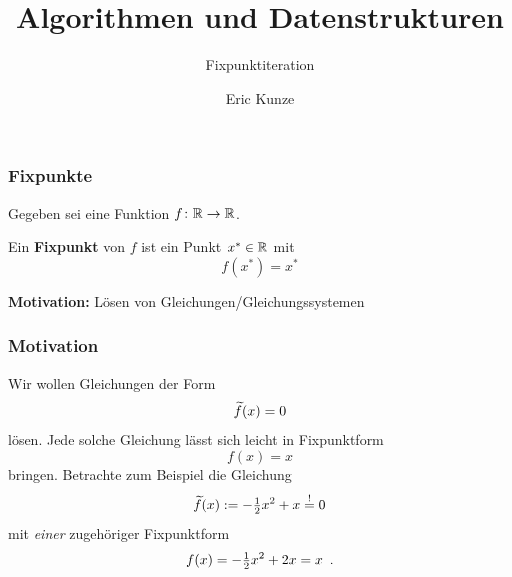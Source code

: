\documentclass{beamer}
\begin{document}
	
	\title{Algorithmen und Datenstrukturen}
	\subtitle{Fixpunktiteration}
	\author{Eric Kunze}
	\date{}

	\maketitle



\begin{frame} \frametitle{Fixpunkte}
	Gegeben sei eine Funktion $f \colon \mathbb{R} \to \mathbb{R}$. 
	
	\begin{definition}
		Ein \textbf{Fixpunkt} von $f$ ist ein Punkt $x^\ast \in \mathbb{R}$ mit
		\begin{equation}
			f(x^\ast) = x^\ast
		\end{equation}
	\end{definition}

	\textbf{Motivation:} Lösen von Gleichungen/Gleichungssystemen
\end{frame}

\begin{frame} \frametitle{Motivation}
	Wir wollen Gleichungen der Form
	\begin{equation}
		\widetilde{f}(x) = 0
	\end{equation}
	lösen. Jede solche Gleichung lässt sich leicht in Fixpunktform
	\begin{equation}
		f(x) = x
	\end{equation}
	bringen. Betrachte zum Beispiel die Gleichung
	\begin{equation}
		\widetilde{f}(x) \mathrel{:=} -\tfrac{1}{2} x^2 + x \overset{!}{=} 0
	\end{equation}
	mit \textit{einer} zugehöriger Fixpunktform 
	\begin{equation}
		f(x) = -\tfrac{1}{2} x^2 + 2x = x \enskip \text{.}
	\end{equation}
\end{frame}
\end{document}

